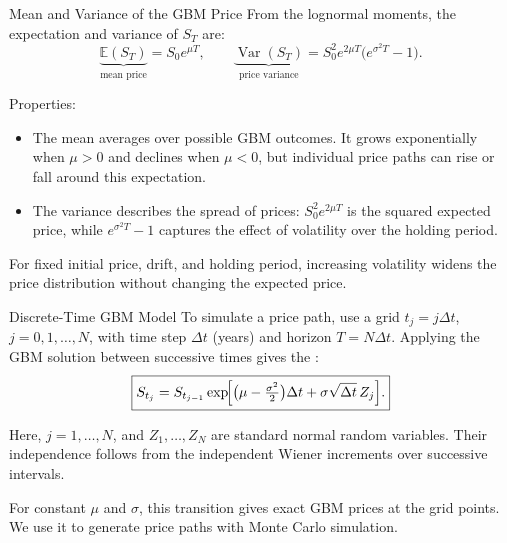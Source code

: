 \documentclass[aspectratio=169,11pt]{beamer}
\newcommand{\E}{\mathbb{E}}
\newcommand{\Var}{\operatorname{Var}}
\begin{document}
\begin{frame}{Mean and Variance of the GBM Price}
  From the lognormal moments, the expectation and variance of $S_T$ are:
  \[
    \underbrace{\E(S_T)}_{\text{mean price}}=S_0e^{\mu T},
    \qquad
    \underbrace{\Var(S_T)}_{\text{price variance}}
    =S_0^2e^{2\mu T}\bigl(e^{\sigma^2T}-1\bigr).
  \]

  Properties:
  \begin{itemize}\setlength{\itemsep}{0.4em}
    \item The mean averages over possible GBM outcomes. It grows exponentially
      when $\mu>0$ and declines when $\mu<0$, but individual price paths can
      rise or fall around this expectation.
    \item The variance describes the spread of prices:
      $S_0^2e^{2\mu T}$ is the squared expected price, while $e^{\sigma^2T}-1$
      captures the effect of volatility over the holding period.
  \end{itemize}

  \vspace{0.5em}
  For fixed initial price, drift, and holding period, increasing
  volatility widens the price distribution without changing the expected price.
\end{frame}

\begin{frame}{Discrete-Time GBM Model}
  To simulate a price path, use a grid $t_j=j\Delta t$, $j=0,1,\ldots,N$,
  with time step $\Delta t$ (years) and horizon $T=N\Delta t$. Applying the
  GBM solution between successive times gives the :
  \[
    \boxed{S_{t_j}=S_{t_{j-1}}\exp\!\Bigl[
      \bigl(\mu-\tfrac{\sigma^2}{2}\bigr)\Delta t
      +\sigma\sqrt{\Delta t}\,Z_j\Bigr].}
  \]

  Here, $j=1,\ldots,N$, and $Z_1,\ldots,Z_N$ are 
  standard normal random variables. Their independence follows from the
  independent Wiener increments over successive intervals.

  \vspace{0.6em}
  For constant $\mu$ and $\sigma$, this transition gives exact GBM prices at
  the grid points. We use it to generate price paths with Monte Carlo simulation.
\end{frame}
\end{document}

